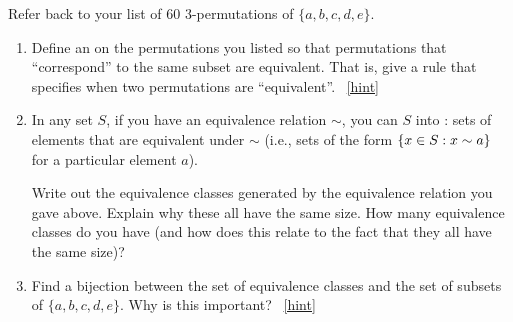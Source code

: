 \documentclass{book}
\begin{document}
\setcounter{project}{109}
\addtocounter{project}{-1}
\begin{activity}[]\label{activity-102}
\hypertarget{p-789}{}%
Refer back to your list of 60 3-permutations of \(\{a,b,c,d,e\}\).%
\begin{enumerate}[font=\bfseries,label=(\alph*),ref=\alph*]
\item\label{task-145} \hypertarget{p-790}{}%
Define an  on the permutations you listed so that permutations that ``correspond'' to the same subset are equivalent.  That is, give a rule that specifies when two permutations are ``equivalent''.%
~\hfill{\tiny\hyperlink{a-109.a}{[hint]}\hypertarget{q-109.a}{}}\item\label{task-146} \hypertarget{p-792}{}%
In any set \(S\), if you have an equivalence relation \(\sim\), you can  \(S\) into : sets of elements that are equivalent under \(\sim\) (i.e., sets of the form \(\{x \in S : x \sim a\} \) for a particular element \(a\)).%
\par
\hypertarget{p-793}{}%
Write out the equivalence classes generated by the equivalence relation you gave above.  Explain why these all have the same size.  How many equivalence classes do you have (and how does this relate to the fact that they all have the same size)?%
\item\label{task-147} \hypertarget{p-794}{}%
Find a bijection between the set of equivalence classes and the set of subsets of \(\{a,b,c,d,e\}\).  Why is this important?%
~\hfill{\tiny\hyperlink{a-109.c}{[hint]}\hypertarget{q-109.c}{}}\end{enumerate}
\end{activity}
\end{document}
